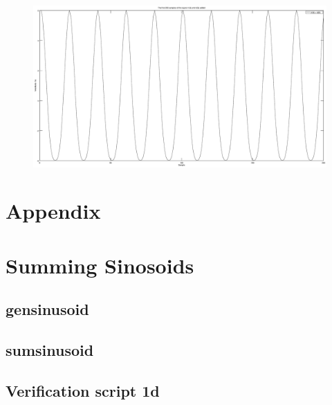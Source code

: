 \documentclass[10pt]{article}
\begin{document}
\subsection{}
\begin{figure}[H]
  \centering
  \includegraphics[width=\columnwidth]{plot1E.eps}\\
  \caption{}
  \label{fig1e}
\end{figure}

\newpage
\section*{Appendix}
\appendix
\section{Summing Sinosoids}
\subsection{gensinusoid}

\subsection{sumsinusoid}

\subsection{Verification script 1d}

\end{document}
